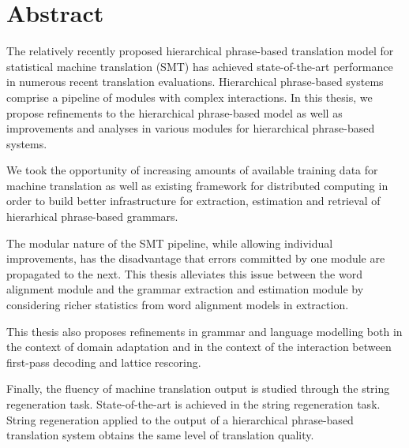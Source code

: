 \chapter*{Abstract}

The relatively recently proposed hierarchical phrase-based
translation model for statistical machine translation (SMT)
has achieved state-of-the-art performance
in numerous recent translation evaluations. Hierarchical phrase-based
systems comprise a pipeline of modules with complex interactions.
In this thesis, we propose refinements to the hierarchical
phrase-based model as well as improvements and analyses in various
modules for hierarchical phrase-based systems.

We took the opportunity of increasing amounts of available training
data for machine translation as well as existing framework for
distributed computing in order to build better infrastructure
for extraction, estimation and retrieval of hierarhical phrase-based
grammars.

The modular nature of the SMT pipeline, while allowing individual
improvements, has the disadvantage that errors committed by
one module are propagated to the next. This thesis
alleviates this issue between the word alignment module and the
grammar extraction and estimation module by considering richer
statistics from word alignment models in extraction.

This thesis also proposes refinements in grammar and language
modelling both in the context of domain adaptation and in the
context of the interaction between first-pass decoding and
lattice rescoring.

Finally, the fluency of machine translation output is studied
through the string regeneration task. State-of-the-art is achieved
in the string regeneration task. String regeneration applied
to the output of a hierarchical phrase-based translation system
obtains the same level of translation quality.
